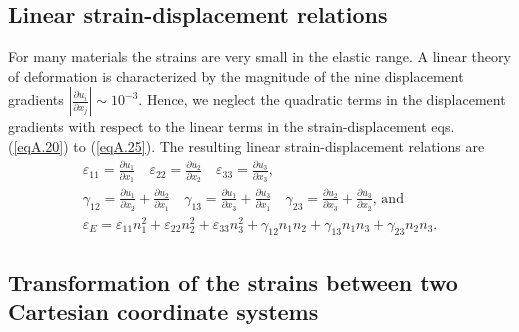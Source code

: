 \documentclass{AeroStructure-ERJohnson}
\begin{document}
\subsection{Linear strain-displacement relations}\label{secA.1.3}

For many materials the strains are very small in the elastic range. A linear theory of deformation is characterized by the magnitude of the nine displacement gradients $\left|\frac{\partial u_{i}}{\partial x_{j}}\right| \sim 10^{-3}$. Hence, we neglect the quadratic terms in the displacement gradients with respect to the linear terms in the strain-displacement eqs. (\ref{eqA.20}) to (\ref{eqA.25}). The resulting linear strain-displacement relations are
\begin{gather}
\varepsilon_{11}=\frac{\partial u_{1}}{\partial x_{1}} \quad \varepsilon_{22}=\frac{\partial u_{2}}{\partial x_{2}} \quad \varepsilon_{33}=\frac{\partial u_{3}}{\partial x_{3}},\label{eqA.35}	\\
\gamma_{12}=\frac{\partial u_{1}}{\partial x_{2}}+\frac{\partial u_{2}}{\partial x_{1}} \quad \gamma_{13}=\frac{\partial u_{1}}{\partial x_{3}}+\frac{\partial u_{3}}{\partial x_{1}} \quad \gamma_{23}=\frac{\partial u_{2}}{\partial x_{3}}+\frac{\partial u_{3}}{\partial x_{2}}\mbox{, and}\label{eqA.36}\\
\varepsilon_{E}=\varepsilon_{11} n_{1}^{2}+\varepsilon_{22} n_{2}^{2}+\varepsilon_{33} n_{3}^{2}+\gamma_{12} n_{1} n_{2}+\gamma_{13} n_{1} n_{3}+\gamma_{23} n_{2} n_{3}.\label{eqA.37}	
\end{gather}

\subsection{Transformation of the strains between two Cartesian coordinate systems}\label{secA.1.4}
\end{document}
